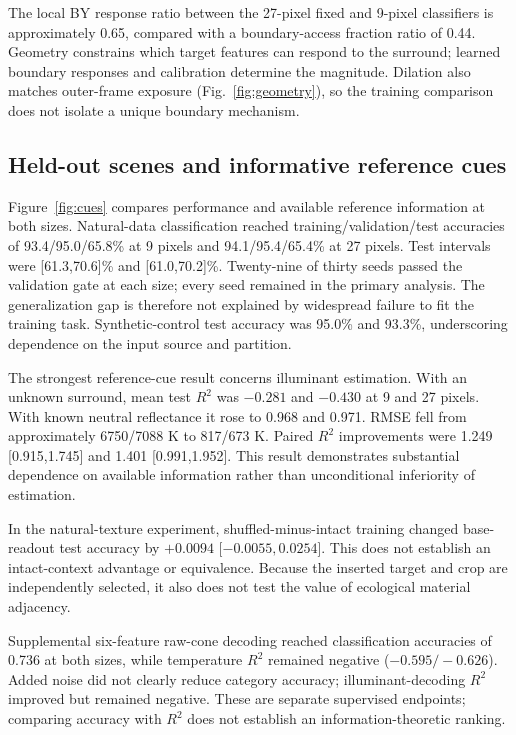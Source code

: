 \documentclass[authoryear,preprint,review,12pt]{elsarticle}
\begin{document}
The local BY response ratio between the 27-pixel fixed and 9-pixel classifiers is approximately 0.65, compared with a boundary-access fraction ratio of 0.44. Geometry constrains which target features can respond to the surround; learned boundary responses and calibration determine the magnitude. Dilation also matches outer-frame exposure (Fig.~\ref{fig:geometry}), so the training comparison does not isolate a unique boundary mechanism.

\subsection{Held-out scenes and informative reference cues}\label{sec:cues}
Figure~\ref{fig:cues} compares performance and available reference information at both sizes. Natural-data classification reached training/validation/test accuracies of 93.4/95.0/65.8\% at 9 pixels and 94.1/95.4/65.4\% at 27 pixels. Test intervals were [61.3,70.6]\% and [61.0,70.2]\%. Twenty-nine of thirty seeds passed the validation gate at each size; every seed remained in the primary analysis. The generalization gap is therefore not explained by widespread failure to fit the training task. Synthetic-control test accuracy was 95.0\% and 93.3\%, underscoring dependence on the input source and partition.

The strongest reference-cue result concerns illuminant estimation. With an unknown surround, mean test $R^2$ was $-0.281$ and $-0.430$ at 9 and 27 pixels. With known neutral reflectance it rose to 0.968 and 0.971. RMSE fell from approximately 6750/7088 K to 817/673 K. Paired $R^2$ improvements were 1.249 [0.915,1.745] and 1.401 [0.991,1.952]. This result demonstrates substantial dependence on available information rather than unconditional inferiority of estimation.

In the natural-texture experiment, shuffled-minus-intact training changed base-readout test accuracy by $+0.0094$ [$-0.0055,0.0254$]. This does not establish an intact-context advantage or equivalence. Because the inserted target and crop are independently selected, it also does not test the value of ecological material adjacency.

Supplemental six-feature raw-cone decoding reached classification accuracies of 0.736 at both sizes, while temperature $R^2$ remained negative ($-0.595/-0.626$). Added noise did not clearly reduce category accuracy; illuminant-decoding $R^2$ improved but remained negative. These are separate supervised endpoints; comparing accuracy with $R^2$ does not establish an information-theoretic ranking.
\end{document}
